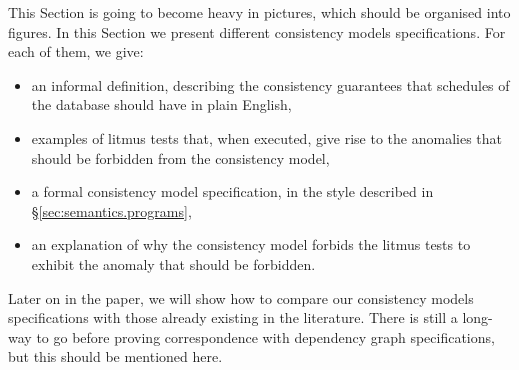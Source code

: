 \label{sec:cmexamples}
\ac{This Section is going to become heavy in pictures, which should be 
organised into figures.}
In this Section we present different consistency models specifications. 
For each of them, we give: 
\begin{itemize}
\item an informal definition, describing the consistency guarantees that 
schedules of the database should have in plain English, 
\item examples of litmus tests that, when executed,  give rise to the anomalies that should be forbidden 
from the consistency model, 
\item a formal consistency model specification, in the style described in \S \ref{sec:semantics.programs},
\item an explanation of why the consistency model forbids the litmus tests to exhibit the anomaly that 
should be forbidden. 
\end{itemize}
Later on in the paper, we will show how to compare our consistency 
models specifications with those already existing in the 
literature.
\ac{There is still a long-way to go before proving correspondence with dependency graph specifications, 
but this should be mentioned here.}

